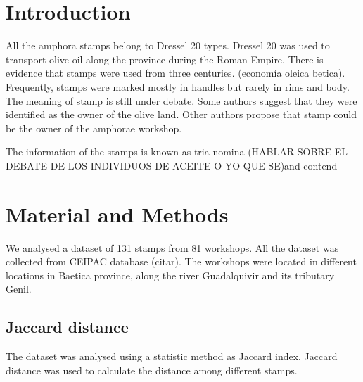 \documentclass[review]{elsarticle}
\begin{document}
\section{Introduction}


All the amphora stamps belong to Dressel 20 types. Dressel 20 was used to transport olive oil along the province during the Roman Empire. There is evidence that stamps were used from three centuries. (economía oleica betica). Frequently, stamps were marked mostly in handles but rarely in rims and body.  
The meaning of stamp is still under debate. Some authors suggest that they were identified as the owner of the olive land. Other authors propose that stamp could be the owner of the amphorae workshop.  



The information of the stamps is known as tria nomina (HABLAR SOBRE EL DEBATE DE LOS INDIVIDUOS DE ACEITE O YO QUE SE)and contend 



\section{Material and Methods}

We analysed a dataset of 131 stamps from 81 workshops. All the dataset was collected from CEIPAC database (citar). The workshops were located in different locations in Baetica province, along the river Guadalquivir and its tributary Genil. 









\subsection{Jaccard distance}

The dataset was analysed using a statistic method as Jaccard index. Jaccard distance was used to calculate the distance among different stamps.  
\end{document}
